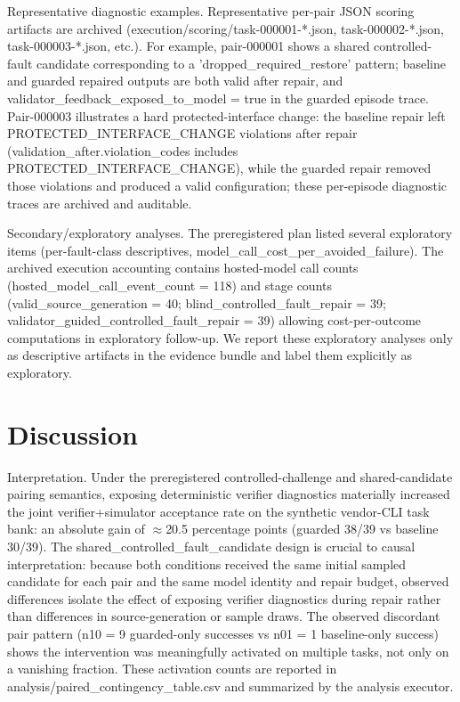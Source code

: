\documentclass[conference]{IEEEtran}
\begin{document}
Representative diagnostic examples. Representative per-pair JSON scoring artifacts are archived (execution/scoring/task-000001-*.json, task-000002-*.json, task-000003-*.json, etc.). For example, pair-000001 shows a shared controlled-fault candidate corresponding to a 'dropped\_required\_restore' pattern; baseline and guarded repaired outputs are both valid after repair, and validator\_feedback\_exposed\_to\_model = true in the guarded episode trace. Pair-000003 illustrates a hard protected-interface change: the baseline repair left PROTECTED\_INTERFACE\_CHANGE violations after repair (validation\_after.violation\_codes includes PROTECTED\_INTERFACE\_CHANGE), while the guarded repair removed those violations and produced a valid configuration; these per-episode diagnostic traces are archived and auditable.

Secondary/exploratory analyses. The preregistered plan listed several exploratory items (per-fault-class descriptives, model\_call\_cost\_per\_avoided\_failure). The archived execution accounting contains hosted-model call counts (hosted\_model\_call\_event\_count = 118) and stage counts (valid\_source\_generation = 40; blind\_controlled\_fault\_repair = 39; validator\_guided\_controlled\_fault\_repair = 39) allowing cost-per-outcome computations in exploratory follow-up. We report these exploratory analyses only as descriptive artifacts in the evidence bundle and label them explicitly as exploratory.

\section{Discussion}
Interpretation. Under the preregistered controlled-challenge and shared-candidate pairing semantics, exposing deterministic verifier diagnostics materially increased the joint verifier+simulator acceptance rate on the synthetic vendor-CLI task bank: an absolute gain of \ensuremath{\approx}20.5 percentage points (guarded 38/39 vs baseline 30/39). The shared\_controlled\_fault\_candidate design is crucial to causal interpretation: because both conditions received the same initial sampled candidate for each pair and the same model identity and repair budget, observed differences isolate the effect of exposing verifier diagnostics during repair rather than differences in source-generation or sample draws. The observed discordant pair pattern (n10 = 9 guarded-only successes vs n01 = 1 baseline-only success) shows the intervention was meaningfully activated on multiple tasks, not only on a vanishing fraction. These activation counts are reported in analysis/paired\_contingency\_table.csv and summarized by the analysis executor.
\end{document}
